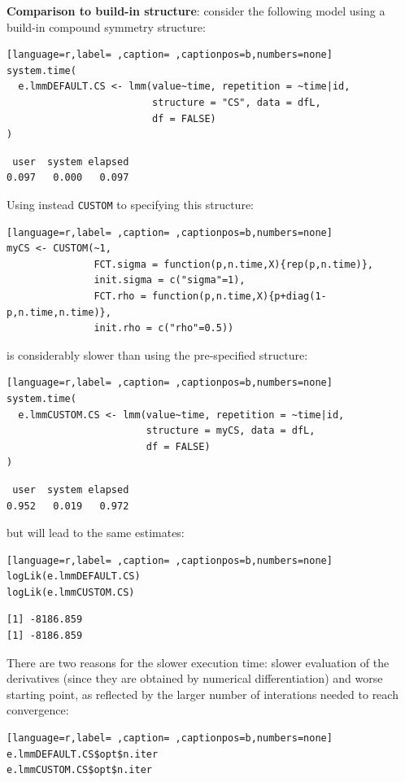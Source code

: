 \documentclass[12pt]{article}
\begin{document}
\textbf{Comparison to build-in structure}: consider the following model using
a build-in compound symmetry structure:
\begin{lstlisting}[language=r,label= ,caption= ,captionpos=b,numbers=none]
system.time(
  e.lmmDEFAULT.CS <- lmm(value~time, repetition = ~time|id,
                         structure = "CS", data = dfL,
                         df = FALSE)
)
\end{lstlisting}

\begin{verbatim}
 user  system elapsed 
0.097   0.000   0.097
\end{verbatim}


Using instead \texttt{CUSTOM} to specifying this structure:
\begin{lstlisting}[language=r,label= ,caption= ,captionpos=b,numbers=none]
myCS <- CUSTOM(~1,
               FCT.sigma = function(p,n.time,X){rep(p,n.time)},
               init.sigma = c("sigma"=1), 
               FCT.rho = function(p,n.time,X){p+diag(1-p,n.time,n.time)},
               init.rho = c("rho"=0.5))
\end{lstlisting}

is considerably slower than using the pre-specified structure:
\begin{lstlisting}[language=r,label= ,caption= ,captionpos=b,numbers=none]
system.time(
  e.lmmCUSTOM.CS <- lmm(value~time, repetition = ~time|id,
                        structure = myCS, data = dfL,
                        df = FALSE)
)
\end{lstlisting}

\begin{verbatim}
 user  system elapsed 
0.952   0.019   0.972
\end{verbatim}



but will lead to the same estimates:
\begin{lstlisting}[language=r,label= ,caption= ,captionpos=b,numbers=none]
logLik(e.lmmDEFAULT.CS)
logLik(e.lmmCUSTOM.CS)
\end{lstlisting}

\begin{verbatim}
[1] -8186.859
[1] -8186.859
\end{verbatim}


There are two reasons for the slower execution time: slower evaluation
of the derivatives (since they are obtained by numerical
differentiation) and worse starting point, as reflected by the larger
number of interations needed to reach convergence:
\begin{lstlisting}[language=r,label= ,caption= ,captionpos=b,numbers=none]
e.lmmDEFAULT.CS$opt$n.iter
e.lmmCUSTOM.CS$opt$n.iter
\end{lstlisting}
\end{document}
